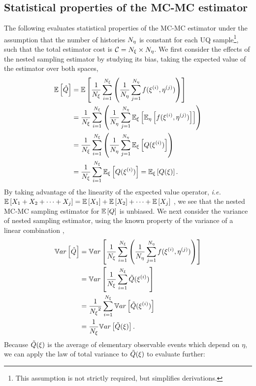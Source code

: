 \subsection{Statistical properties of the MC-MC estimator}
The following evaluates statistical properties of the MC-MC estimator under the assumption that the number of histories ${N_\eta}$ is constant for each UQ sample\footnote{This assumption is not strictly required, but simplifies derivations.}, such that the total estimator cost is $\mathcal{C} = {N_\xi} \times {N_\eta}$. We first consider the effects of the nested sampling estimator by studying its bias, taking the expected value of the estimator over both spaces,
\begin{equation}\label{eq:EE-qhat}
    \begin{split}
        \mathbb{E}\left[\hat{Q}\right] &= \mathbb{E}\left[\frac{1}{{N_\xi}} \sum_{i=1}^{{N_\xi}} \left(\frac{1}{{N_\eta}}\sum_{j=1}^{N_\eta} f(\xi^{(i)},\eta^{(j)}) \right)\right] \\
        &= \frac{1}{{N_\xi}} \sum_{i=1}^{{N_\xi}} \left(\frac{1}{{N_\eta}} \sum_{j=1}^{N_\eta} \mathbb{E}_\xi\left[\mathbb{E}_\eta\left[f(\xi^{(i)},\eta^{(j)})\right]\right] \right) \\
        &= \frac{1}{{N_\xi}} \sum_{i=1}^{{N_\xi}} \left( \frac{1}{{N_\eta}} \sum_{j=1}^{N_\eta} \mathbb{E}_\xi\left[Q(\xi^{(i)})\right] \right) \\
        &= \frac{1}{{N_\xi}} \sum_{i=1}^{{N_\xi}} \mathbb{E}_\xi\left[Q(\xi^{(i)})\right] = \mathbb{E}_\xi\left[Q(\xi)\right] .
    \end{split}
\end{equation}
By taking advantage of the linearity of the expected value operator, \textit{i.e.} $\mathbb{E}\left[X_1 + X_2 + \cdots + X_j\right] = \mathbb{E}\left[X_1\right] + \mathbb{E}\left[X_2\right] + \cdots + \mathbb{E}\left[X_j\right]$ \cite{Larsen-statistics}, we see that the nested MC-MC sampling estimator for $\mathbb{E}\left[Q\right]$ is unbiased. We next consider the variance of nested sampling estimator, using the known property of the variance of a linear combination \cite{Larsen-statistics},
\begin{equation}\label{eq:Var-qhat}
    \begin{split}
        \mathbb{V}ar\left[\hat{Q}\right] &= \mathbb{V}ar\left[\frac{1}{{N_\xi}} \sum_{i=1}^{{N_\xi}} \left( \frac{1}{{N_\eta}} \sum_{j=1}^{N_\eta} f(\xi^{(i)},\eta^{(j)}) \right)\right] \\
        &= \mathbb{V}ar\left[\frac{1}{{N_\xi}} \sum_{i=1}^{{N_\xi}} \tilde{Q}(\xi^{(i)})\right] \\
        &= \frac{1}{{N_\xi}^2} \sum_{i=1}^{{N_\xi}} \mathbb{V}ar\left[\tilde{Q}(\xi^{(i)})\right] \\
        &= \frac{1}{{N_\xi}} \mathbb{V}ar\left[\tilde{Q}(\xi)\right] .
    \end{split}
\end{equation}
Because $\tilde{Q}(\xi)$ is the average of elementary observable events which depend on $\eta$, we can apply the law of total variance \cite{Weiss-prob} to $\tilde{Q}(\xi)$ to evaluate further:
